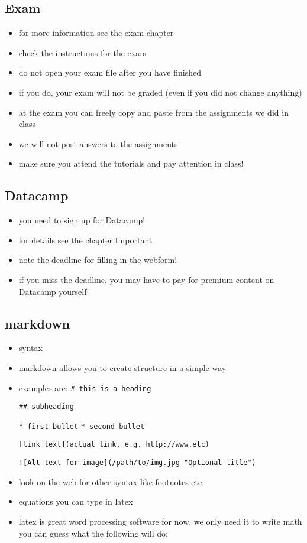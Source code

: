 \documentclass[]{book}
\providecommand{\tightlist}{%
  \setlength{\itemsep}{0pt}\setlength{\parskip}{0pt}}
\begin{document}
\hypertarget{exam}{%
\subsection{Exam}\label{exam}}

\begin{itemize}
\tightlist
\item
  for more information see the exam chapter
\item
  check the instructions for the exam
\item
  do not open your exam file after you have finished
\item
  if you do, your exam will not be graded (even if you did not change anything)
\item
  at the exam you can freely copy and paste from the assignments we did in class
\item
  we will not post answers to the assignments
\item
  make sure you attend the tutorials and pay attention in class!
\end{itemize}

\hypertarget{datacamp-1}{%
\subsection{Datacamp}\label{datacamp-1}}

\begin{itemize}
\tightlist
\item
  you need to sign up for Datacamp!
\item
  for details see the chapter Important
\item
  note the deadline for filling in the webform!
\item
  if you miss the deadline, you may have to pay for premium content on Datacamp yourself
\end{itemize}

\hypertarget{markdown}{%
\subsection{markdown}\label{markdown}}

\begin{itemize}
\item
  syntax
\item
  markdown allows you to create structure in a simple way
\item
  examples are:
  \texttt{\#\ this\ is\ a\ heading}

  \texttt{\#\#\ subheading}

  \texttt{*\ first\ bullet}
  \texttt{*\ second\ bullet}

  \texttt{{[}link\ text{]}(actual\ link,\ e.g.\ http://www.etc)}

  \texttt{!{[}Alt\ text\ for\ image{]}(/path/to/img.jpg\ "Optional\ title")}
\item
  look on the web for other syntax like footnotes etc.
\item
  equations you can type in latex
\item
  latex is great word processing software
  for now, we only need it to write math
  you can guess what the following will do:
\end{itemize}
\end{document}
